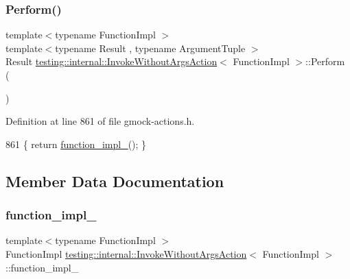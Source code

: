 \mbox{\label{classtesting_1_1internal_1_1InvokeWithoutArgsAction_abdad2b7d19ff1cbd1d07a4bd585e3f4c}} 
\subsubsection{\texorpdfstring{Perform()}{Perform()}}
{\footnotesize\ttfamily template$<$typename Function\+Impl $>$ \\
template$<$typename Result , typename Argument\+Tuple $>$ \\
Result \hyperlink{classtesting_1_1internal_1_1InvokeWithoutArgsAction}{testing\+::internal\+::\+Invoke\+Without\+Args\+Action}$<$ Function\+Impl $>$\+::Perform (\begin{DoxyParamCaption}\item[{const Argument\+Tuple \&}]{ }\end{DoxyParamCaption})\hspace{0.3cm}{\ttfamily [inline]}}



Definition at line 861 of file gmock-\/actions.\+h.


\begin{DoxyCode}
861 \{ \textcolor{keywordflow}{return} \hyperlink{classtesting_1_1internal_1_1InvokeWithoutArgsAction_a29e9e7e089dd4b66fc931c0da54809b1}{function\_impl\_}(); \}
\end{DoxyCode}


\subsection{Member Data Documentation}
\mbox{\label{classtesting_1_1internal_1_1InvokeWithoutArgsAction_a29e9e7e089dd4b66fc931c0da54809b1}} 
\subsubsection{\texorpdfstring{function\+\_\+impl\+\_\+}{function\_impl\_}}
{\footnotesize\ttfamily template$<$typename Function\+Impl $>$ \\
Function\+Impl \hyperlink{classtesting_1_1internal_1_1InvokeWithoutArgsAction}{testing\+::internal\+::\+Invoke\+Without\+Args\+Action}$<$ Function\+Impl $>$\+::function\+\_\+impl\+\_\+\hspace{0.3cm}{\ttfamily [private]}}



